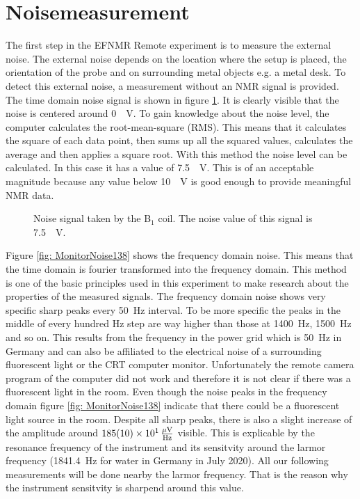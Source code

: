 \section{Noisemeasurement}
\label{sec:Noisemeasurement}
The first step in the EFNMR Remote experiment is to measure the external noise.
The external noise depends on the location where the setup is placed, the orientation of the probe and on surrounding metal objects e.g. a metal desk.
To detect this external noise, a measurement without an NMR signal is provided.
The time domain noise signal is shown in figure \ref{fig: noise}.
It is clearly visible that the noise is centered around \SI{0}{\mu \volt}.
To gain knowledge about the noise level, the computer calculates the root-mean-square (RMS).
This means that it calculates the square of each data point, then sums up all the squared values, calculates the average and then applies a square root.
With this method the noise level can be calculated.
In this case it has a value of \SI{7.5}{\mu \volt}.
This is of an acceptable magnitude because any value below \SI{10}{\mu \volt} is good enough to provide meaningful NMR data.

\begin{figure}[H]
    \centering
    
    \caption[Noise signal taken by the B$_1$ coil.]{Noise signal taken by the B$_1$ coil.
    The noise value of this signal is \SI{7.5}{\mu \volt}.}
    \label{fig: noise}
\end{figure}

Figure \ref{fig: MonitorNoise138} shows the frequency domain noise.
This means that the time domain is fourier transformed into the frequency domain.
This method is one of the basic principles used in this experiment to make research about the properties of the measured signals.
The frequency domain noise shows very specific sharp peaks every \SI{50}{\hertz} interval.
To be more specific the peaks in the middle of every hundred \si{\hertz} step are way higher than those at \SI{1400}{\hertz}, \SI{1500}{\hertz} and so on.
This results from the frequency in the power grid which is \SI{50}{\hertz} in Germany and can also be affiliated to the electrical noise of a surrounding fluorescent light or the CRT computer monitor.
Unfortunately the remote camera program of the computer did not work and therefore it is not clear if there was a fluorescent light in the room.
Even though the noise peaks in the frequency domain figure \ref{fig: MonitorNoise138} indicate that there could be a fluorescent light source in the room.
Despite all sharp peaks, there is also a slight increase of the amplitude around $\SI{185 \pm 10 e1}{\frac{\mu \volt}{\hertz}}$ visible.
This is explicable by the resonance frequency of the instrument and its sensitvity around the larmor frequency (\SI{1841.4}{\hertz} for water in Germany in July 2020).
All our following measurements will be done nearby the larmor frequency.
That is the reason why the instrument sensitvity is sharpend around this value.

